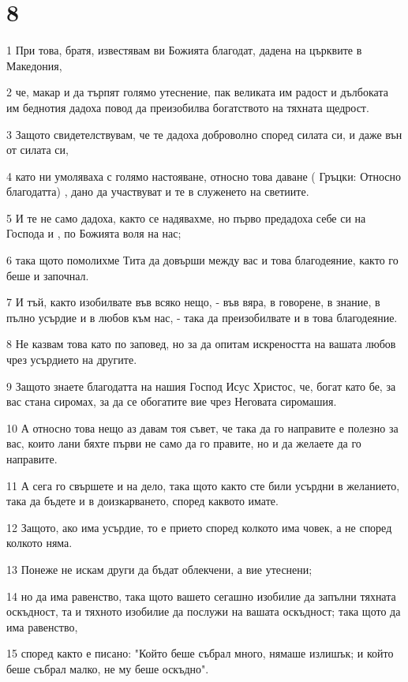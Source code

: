 \chapter{8}

\par 1 При това, братя, известявам ви Божията благодат, дадена на църквите в Македония,
\par 2 че, макар и да търпят голямо утеснение, пак великата им радост и дълбоката им беднотия дадоха повод да преизобилва богатството на тяхната щедрост.
\par 3 Защото свидетелствувам, че те дадоха доброволно според силата си, и даже вън от силата си,
\par 4 като ни умоляваха с голямо настояване, относно това даване ( Гръцки: Относно благодатта) , дано да участвуват и те в служенето на светиите.
\par 5 И те не само дадоха, както се надявахме, но първо предадоха себе си на Господа и , по Божията воля на нас;
\par 6 така щото помолихме Тита да довърши между вас и това благодеяние, както го беше и започнал.
\par 7 И тъй, както изобилвате във всяко нещо, - във вяра, в говорене, в знание, в пълно усърдие и в любов към нас, - така да преизобилвате и в това благодеяние.
\par 8 Не казвам това като по заповед, но за да опитам искреността на вашата любов чрез усърдието на другите.
\par 9 Защото знаете благодатта на нашия Господ Исус Христос, че, богат като бе, за вас стана сиромах, за да се обогатите вие чрез Неговата сиромашия.
\par 10 А относно това нещо аз давам тоя съвет, че така да го направите е полезно за вас, които лани бяхте първи не само да го правите, но и да желаете да го направите.
\par 11 А сега го свършете и на дело, така щото както сте били усърдни в желанието, така да бъдете и в доизкарването, според каквото имате.
\par 12 Защото, ако има усърдие, то е прието според колкото има човек, а не според колкото няма.
\par 13 Понеже не искам други да бъдат облекчени, а вие утеснени;
\par 14 но да има равенство, така щото вашето сегашно изобилие да запълни тяхната оскъдност, та и тяхното изобилие да послужи на вашата оскъдност; така щото да има равенство,
\par 15 според както е писано: "Който беше събрал много, нямаше излишък; и който беше събрал малко, не му беше оскъдно".
